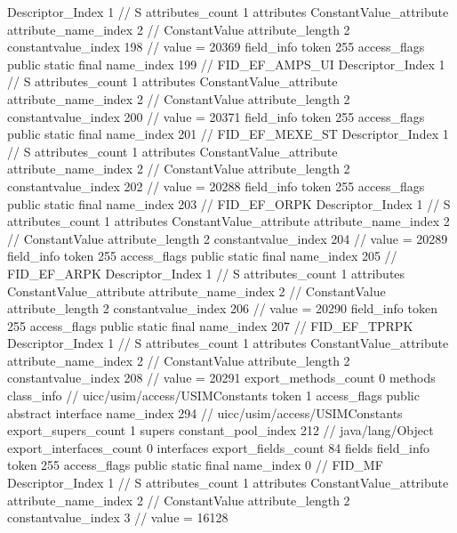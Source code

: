 {{{{{				Descriptor_Index	1		// S
				attributes_count	1
				attributes {
				ConstantValue_attribute {
					attribute_name_index	2		// ConstantValue
					attribute_length	2
					constantvalue_index	198		// value = 20369
				}
				}
			}
			field_info {
				token	255
				access_flags	public static final
				name_index	199		// FID_EF_AMPS_UI
				Descriptor_Index	1		// S
				attributes_count	1
				attributes {
				ConstantValue_attribute {
					attribute_name_index	2		// ConstantValue
					attribute_length	2
					constantvalue_index	200		// value = 20371
				}
				}
			}
			field_info {
				token	255
				access_flags	public static final
				name_index	201		// FID_EF_MEXE_ST
				Descriptor_Index	1		// S
				attributes_count	1
				attributes {
				ConstantValue_attribute {
					attribute_name_index	2		// ConstantValue
					attribute_length	2
					constantvalue_index	202		// value = 20288
				}
				}
			}
			field_info {
				token	255
				access_flags	public static final
				name_index	203		// FID_EF_ORPK
				Descriptor_Index	1		// S
				attributes_count	1
				attributes {
				ConstantValue_attribute {
					attribute_name_index	2		// ConstantValue
					attribute_length	2
					constantvalue_index	204		// value = 20289
				}
				}
			}
			field_info {
				token	255
				access_flags	public static final
				name_index	205		// FID_EF_ARPK
				Descriptor_Index	1		// S
				attributes_count	1
				attributes {
				ConstantValue_attribute {
					attribute_name_index	2		// ConstantValue
					attribute_length	2
					constantvalue_index	206		// value = 20290
				}
				}
			}
			field_info {
				token	255
				access_flags	public static final
				name_index	207		// FID_EF_TPRPK
				Descriptor_Index	1		// S
				attributes_count	1
				attributes {
				ConstantValue_attribute {
					attribute_name_index	2		// ConstantValue
					attribute_length	2
					constantvalue_index	208		// value = 20291
				}
				}
			}
			}
			export_methods_count	0
			methods {
			}
		}
		class_info {		// uicc/usim/access/USIMConstants
			token	1
			access_flags	public abstract interface
			name_index	294		// uicc/usim/access/USIMConstants
			export_supers_count	1
			supers {
				constant_pool_index	212		// java/lang/Object
			}
			export_interfaces_count	0
			interfaces {
			}
			export_fields_count	84
			fields {
			field_info {
				token	255
				access_flags	public static final
				name_index	0		// FID_MF
				Descriptor_Index	1		// S
				attributes_count	1
				attributes {
				ConstantValue_attribute {
					attribute_name_index	2		// ConstantValue
					attribute_length	2
					constantvalue_index	3		// value = 16128
}}}}}}}
